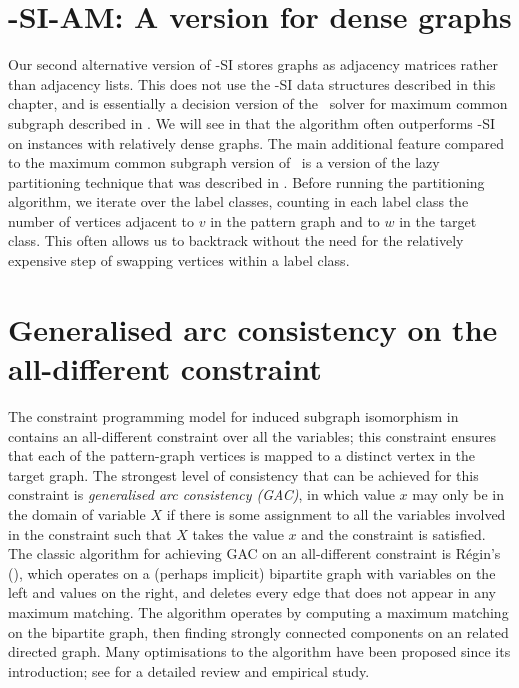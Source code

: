\section{\McSplit-SI-AM: A version for dense graphs}\label{sec:mcsplit-si-adjmat}

Our second alternative version of \McSplit-SI 
stores graphs as adjacency matrices rather than
adjacency lists.  This does not use the \McSplit-SI data structures described
in this chapter, and is essentially a decision version of the \McSplit\ solver
for maximum common subgraph described in .
We will see in 
that the algorithm often outperforms \McSplit-SI on instances with
relatively dense graphs.  The main additional feature compared to the maximum
common subgraph version of \McSplit\ is a version of the lazy partitioning
technique that was described in .  Before
running the partitioning algorithm, we iterate over the label classes, counting
in each label class the number of vertices adjacent to $v$ in the pattern graph
and to $w$ in the target class.  This often allows us to backtrack without the
need for the relatively expensive step of swapping vertices within a label
class.

\section{Generalised arc consistency on the all-different constraint}\label{sec:mcsplit-si-gac}

The constraint programming model for induced subgraph isomorphism in 
contains an all-different
constraint over all the variables; this constraint ensures that each of the pattern-graph vertices
is mapped to a distinct vertex in the target graph.  The strongest level of consistency that can
be achieved for this constraint is \emph{generalised arc consistency (GAC)}, in which value
$x$ may only be in the domain of variable $X$ if there is some assignment to all
the variables involved in the constraint such that $X$ takes the value $x$
and the constraint is satisfied.
The classic algorithm for achieving GAC on an all-different constraint is R\'egin's
(\citeyear{DBLP:conf/aaai/Regin94}), which operates
on a (perhaps implicit) bipartite graph with variables on the left and values on the right, and 
deletes every edge that does not appear in any maximum matching.  The algorithm operates by computing
a maximum matching on the bipartite graph, then finding strongly connected components on an related directed
graph.  Many optimisations to the algorithm have been proposed since its introduction; see
\cite{DBLP:journals/ai/GentMN08} for a detailed review and empirical study.

